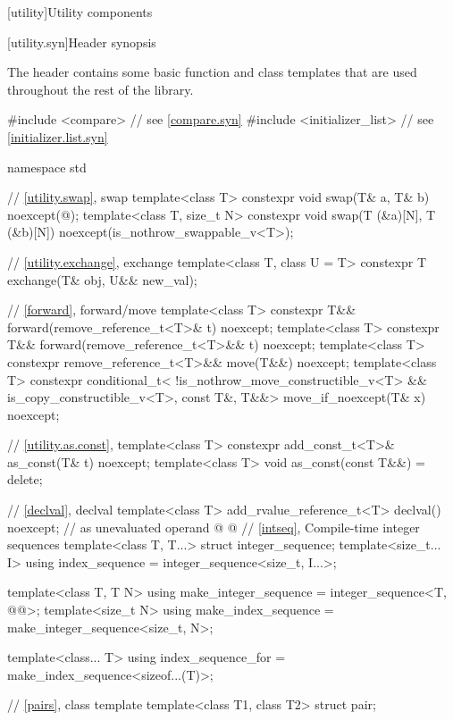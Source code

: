 [utility]{Utility components}

[utility.syn]{Header  synopsis}

\pnum
The header 
contains some basic function and class templates that are used
throughout the rest of the library.

\begin{codeblock}
#include <compare>              // see \ref{compare.syn}
#include <initializer_list>     // see \ref{initializer.list.syn}

namespace std {
  // \ref{utility.swap}, swap
  template<class T>
    constexpr void swap(T& a, T& b) noexcept(@\seebelow@);
  template<class T, size_t N>
    constexpr void swap(T (&a)[N], T (&b)[N]) noexcept(is_nothrow_swappable_v<T>);

  // \ref{utility.exchange}, exchange
  template<class T, class U = T>
    constexpr T exchange(T& obj, U&& new_val);

  // \ref{forward}, forward/move
  template<class T>
    constexpr T&& forward(remove_reference_t<T>& t) noexcept;
  template<class T>
    constexpr T&& forward(remove_reference_t<T>&& t) noexcept;
  template<class T>
    constexpr remove_reference_t<T>&& move(T&&) noexcept;
  template<class T>
    constexpr conditional_t<
        !is_nothrow_move_constructible_v<T> && is_copy_constructible_v<T>, const T&, T&&>
      move_if_noexcept(T& x) noexcept;

  // \ref{utility.as.const}, 
  template<class T>
    constexpr add_const_t<T>& as_const(T& t) noexcept;
  template<class T>
    void as_const(const T&&) = delete;

  // \ref{declval}, declval
  template<class T>
    add_rvalue_reference_t<T> declval() noexcept;   // as unevaluated operand
@%
%
%
%
@
  // \ref{intseq}, Compile-time integer sequences
  template<class T, T...>
    struct integer_sequence;
  template<size_t... I>
    using index_sequence = integer_sequence<size_t, I...>;

  template<class T, T N>
    using make_integer_sequence = integer_sequence<T, @\seebelow{}@>;
  template<size_t N>
    using make_index_sequence = make_integer_sequence<size_t, N>;

  template<class... T>
    using index_sequence_for = make_index_sequence<sizeof...(T)>;

  // \ref{pairs}, class template 
  template<class T1, class T2>
    struct pair;

}
\end{codeblock}
